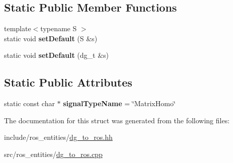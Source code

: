 \subsection*{Static Public Member Functions}
\begin{DoxyCompactItemize}
\item 
{\footnotesize template$<$typename S $>$ }\\static void {\bfseries set\+Default} (S \&s)\hypertarget{structdynamic__graph_1_1DgToRos_3_01MatrixHomogeneous_01_4_aff1ef46b1fcaee004c237c428688cde9}{}\label{structdynamic__graph_1_1DgToRos_3_01MatrixHomogeneous_01_4_aff1ef46b1fcaee004c237c428688cde9}

\item 
static void {\bfseries set\+Default} (dg\+\_\+t \&s)\hypertarget{structdynamic__graph_1_1DgToRos_3_01MatrixHomogeneous_01_4_a5e5e0b9c45f7a25764ae809c1b83eeb9}{}\label{structdynamic__graph_1_1DgToRos_3_01MatrixHomogeneous_01_4_a5e5e0b9c45f7a25764ae809c1b83eeb9}

\end{DoxyCompactItemize}
\subsection*{Static Public Attributes}
\begin{DoxyCompactItemize}
\item 
static const char $\ast$ {\bfseries signal\+Type\+Name} = \char`\"{}Matrix\+Homo\char`\"{}\hypertarget{structdynamic__graph_1_1DgToRos_3_01MatrixHomogeneous_01_4_a4b7828ee5ca8c39150cab5be677d0497}{}\label{structdynamic__graph_1_1DgToRos_3_01MatrixHomogeneous_01_4_a4b7828ee5ca8c39150cab5be677d0497}

\end{DoxyCompactItemize}


The documentation for this struct was generated from the following files\+:\begin{DoxyCompactItemize}
\item 
include/ros\+\_\+entities/\hyperlink{dg__to__ros_8hh}{dg\+\_\+to\+\_\+ros.\+hh}\item 
src/ros\+\_\+entities/\hyperlink{dg__to__ros_8cpp}{dg\+\_\+to\+\_\+ros.\+cpp}\end{DoxyCompactItemize}
